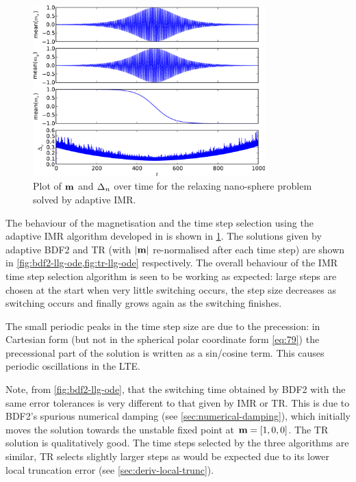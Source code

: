 \begin{figure}
  \centering
  \includegraphics[width=0.8\textwidth]{plots/aimr-sphere-relax/imr0-meanmxsvs-meanmysvs-meanmzsvs-dtsvstimes.pdf}
  \caption{Plot of $\boldsymbol{\mathrm{m}}$ and $\Delta_{n}$ over time for the relaxing nano-sphere problem solved by adaptive IMR.}
  \label{fig:imr-llg-ode}
\end{figure}

The behaviour of the magnetisation and the time step selection using the adaptive IMR algorithm developed in  is shown in \cref{fig:imr-llg-ode}.
The solutions given by adaptive BDF2 and TR (with $\left|{\boldsymbol{\mathrm{m}}} \right|$ re-normalised after each time step)  are shown in \cref{fig:bdf2-llg-ode,fig:tr-llg-ode} respectively.
The overall behaviour of the IMR time step selection algorithm is seen to be working as expected: large steps are chosen at the start when very little switching occurs, the step size decreases as switching occurs and finally grows again as the switching finishes.

The small periodic peaks in the time step size are due to the precession: in Cartesian form (but not in the spherical polar coordinate form \cref{eq:79}) the precessional part of the solution is written as a sin/cosine term.
This causes periodic oscillations in the LTE.

Note, from \cref{fig:bdf2-llg-ode}, that the switching time obtained by BDF2 with the same error tolerances is very different to that given by IMR or TR.
This is due to BDF2's spurious numerical damping (see \cref{sec:numerical-damping}), which initially moves the solution towards the unstable fixed point at $\boldsymbol{\mathrm{m}}=[1, 0, 0]$.
The TR solution is qualitatively good.
The time steps selected by the three algorithms are similar, TR selects slightly larger steps as would be expected due to its lower local truncation error (see \cref{sec:deriv-local-trunc}).


